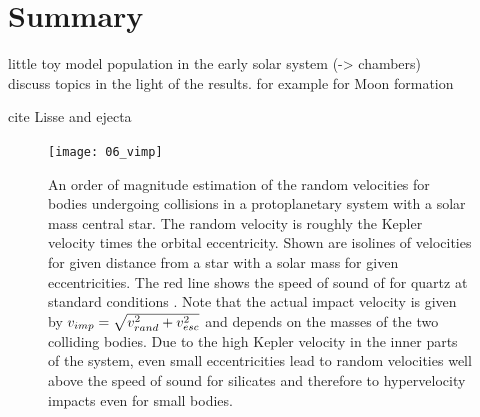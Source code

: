 \section{Summary}
little toy model population in the early solar system (-> chambers) \\
discuss topics in the light of the results. for example for Moon formation

cite Lisse and ejecta\\

\begin{figure}
\begin{center}
\texttt{[image: 06\_vimp]}
\caption{An order of magnitude estimation of the random velocities for bodies undergoing collisions in a protoplanetary system with a solar mass central star. The random velocity is roughly the Kepler velocity times the orbital eccentricity. Shown are isolines of velocities for given distance from a star with a solar mass for given eccentricities. The red line shows the speed of sound of for quartz at standard conditions \cite{Melosh:2007p3502}. Note that the actual impact velocity is given by $v_{imp} = \sqrt{ v_{rand}^2 + v_{esc}^2}$ and depends on the masses of the two colliding bodies. Due to the high Kepler velocity in the inner parts of the system, even small eccentricities lead to random velocities well above the speed of sound for silicates and therefore to hypervelocity impacts even for small bodies.}
\label{ch03_fig06}
\end{center}
\end{figure}




\cite{Asphaug:2006p3729}

\cite{Asphaug:2010p3539}


